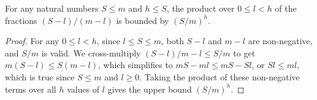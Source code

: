 \begin{helper}
For any natural numbers $S \le m$ and $h \le S$, the product over $0 \le l < h$ of the fractions $(S-l)/(m-l)$ is bounded by $(S/m)^h$.
\end{helper}
\begin{proof}
For any $0 \le l < h$, since $l \le S \le m$, both $S-l$ and $m-l$ are non-negative, and $S/m$ is valid. We cross-multiply $(S-l)/m-l \le S/m$ to get $m(S-l) \le S(m-l)$, which simplifies to $mS - ml \le mS - Sl$, or $Sl \le ml$, which is true since $S \le m$ and $l \ge 0$.
Taking the product of these non-negative terms over all $h$ values of $l$ gives the upper bound $(S/m)^h$.
\end{proof}

